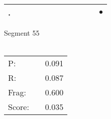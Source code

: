 \documentclass[landscape]{article}
\newcommand{\ssp}{\hspace{2pt}}
\newcommand{\mex}{\cellcolor{g}$\bullet$}
\begin{document}
\begin{tabular}{|l|p{10pt}|p{10pt}|p{10pt}|p{10pt}|p{10pt}|p{10pt}|p{10pt}|p{10pt}|p{10pt}|p{10pt}|p{10pt}|}
\hline
\ssp \cellcolor{ref10}. \ssp&\hspace{2pt}&\hspace{2pt}&\hspace{2pt}&\hspace{2pt}&\hspace{2pt}&\hspace{2pt}&\hspace{2pt}&\hspace{2pt}&\hspace{2pt}&\hspace{2pt}&\hspace{2pt}\mex\\
\hline
\end{tabular}

\vspace{6pt}
\noindent Segment 55\\\\
\noindent\begin{tabular}{lm{12pt}r}
\hline
P:&&0.091\\
R:&&0.087\\
Frag:&&0.600\\
Score:&&0.035\\
\end{tabular}

\newpage
\end{document}
